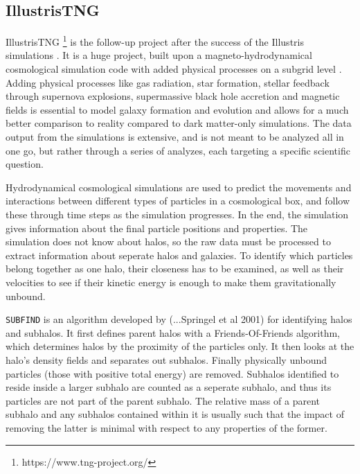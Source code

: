 \subsection{IllustrisTNG}
IllustrisTNG \footnote{https://www.tng-project.org/} is the follow-up project after the success of the Illustris simulations \parencite{Springel2017, Pillepich2017,Naiman2018, Nelson2017, Marinacci2018}. It is a huge project, built upon a magneto-hydrodynamical cosmological simulation code with added physical processes on a subgrid level \parencite{Weinberger2016}. Adding physical processes like gas radiation, star formation, stellar feedback through supernova explosions, supermassive black hole accretion and magnetic fields is essential to model galaxy formation and evolution and allows for a much better comparison to reality compared to dark matter-only simulations. The data output from the simulations is extensive, and is not meant to be analyzed all in one go, but rather through a series of analyzes, each targeting a specific scientific question. 

Hydrodynamical cosmological simulations are used to predict the movements and interactions between different types of particles in a cosmological box, and follow these through time steps as the simulation progresses. In the end, the simulation gives information about the final particle positions and properties. The simulation does not know about halos, so the raw data must be processed to extract information about seperate halos and galaxies. To identify which particles belong together as one halo, their closeness has to be examined, as well as their velocities to see if their kinetic energy is enough to make them gravitationally unbound.

\texttt{SUBFIND} is an algorithm developed by (...Springel et al 2001) for identifying halos and subhalos. It first defines parent halos with a Friends-Of-Friends algorithm, which determines halos by the proximity of the particles only. It then looks at the halo's density fields and separates out subhalos. Finally physically unbound particles (those with positive total energy) are removed. Subhalos identified to reside inside a larger subhalo are counted as a seperate subhalo, and thus its particles are not part of the parent subhalo. The relative mass of a parent subhalo and any subhalos contained within it is usually such that the impact of removing the latter is minimal with respect to any properties of the former.


